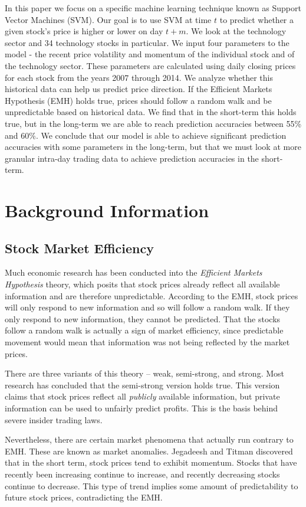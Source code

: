 \documentclass[pageno]{jpaper}
\begin{document}
In this paper we focus on a specific machine learning technique known as Support Vector Machines (SVM). Our goal is to use SVM at time $t$ to predict whether a given stock's price is higher or lower on day $t+m$. We look at the technology sector and 34 technology stocks in particular. We input four parameters to the model - the recent price volatility and momentum of the individual stock and of the technology sector. These parameters are calculated using daily closing prices for each stock from the years 2007 through 2014. We analyze whether this historical data can help us predict price direction. If the Efficient Markets Hypothesis (EMH) holds true, prices should follow a random walk and be unpredictable based on historical data. We find that in the short-term this holds true, but in the long-term we are able to reach prediction accuracies between 55\% and 60\%. We conclude that our model is able to achieve significant prediction accuracies with some parameters in the long-term, but that we must look at more granular intra-day trading data to achieve prediction accuracies in the short-term.

\section{Background Information}
\subsection{Stock Market Efficiency}
\label{subsec: stock}
Much economic research has been conducted into the {\em Efficient Markets Hypothesis} theory, which posits that stock prices already reflect all available information \cite{bodie} and are therefore unpredictable. According to the EMH, stock prices will only respond to new information and so will follow a random walk. If they only respond to new information, they cannot be predicted. That the stocks follow a random walk is actually a sign of market efficiency, since predictable movement would mean that information was not being reflected by the market prices.

There are three variants of this theory -- weak, semi-strong, and strong. Most research has concluded that the semi-strong version holds true. This version claims that stock prices reflect all {\em publicly} available information, but private information can be used to unfairly predict profits. This is the basis behind severe insider trading laws.

Nevertheless, there are certain market phenomena that actually run contrary to EMH. These are known as market anomalies. Jegadeesh and Titman discovered that in the short term, stock prices tend to exhibit momentum\cite{jegadeesh}. Stocks that have recently been increasing continue to increase, and recently decreasing stocks continue to decrease. This type of trend implies some amount of predictability to future stock prices, contradicting the EMH. 
\end{document}
